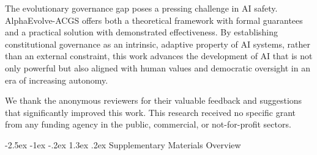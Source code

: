 \documentclass[manuscript,screen,review,anonymous,9pt]{acmart}
\makeatletter
\renewcommand\section{\@startsection{section}{1}{\z@}%
  {-2.5ex \@plus -1ex \@minus -.2ex}%
  {1.3ex \@plus.2ex}%
  {\normalfont\Large\bfseries}}
\makeatother
\begin{document}
The evolutionary governance gap poses a pressing challenge in AI safety. AlphaEvolve-ACGS offers both a theoretical framework with formal guarantees and a practical solution with demonstrated effectiveness. By establishing constitutional governance as an intrinsic, adaptive property of AI systems, rather than an external constraint, this work advances the development of AI that is not only powerful but also aligned with human values and democratic oversight in an era of increasing autonomy.

\begin{acks}
We thank the anonymous reviewers for their valuable feedback and suggestions that significantly improved this work. This research received no specific grant from any funding agency in the public, commercial, or not-for-profit sectors. 
\end{acks}


 


\appendix

\section{Supplementary Materials Overview} 
\label{app:supplementary}
\end{document}
